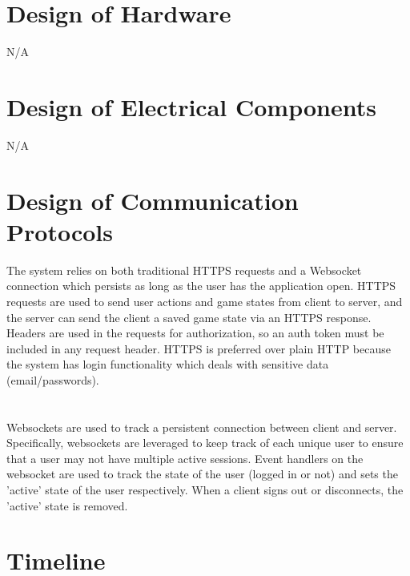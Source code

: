\documentclass[12pt, titlepage]{article}
\begin{document}
\section{Design of Hardware}
N/A

\section{Design of Electrical Components}
N/A

\section{Design of Communication Protocols}
The system relies on both traditional HTTPS requests and a Websocket connection which persists as long as the user has the application open. HTTPS requests are used to send user actions and game states from client to server, and the server can send the client a saved game state via an HTTPS response. Headers are used in the requests for authorization, so an auth token must be included in any request header. HTTPS is preferred over plain HTTP because the system has login functionality which deals with sensitive data (email/passwords).\\
\\
\\ Websockets are used to track a persistent connection between client and server. Specifically, websockets are leveraged to keep track of each unique user to ensure that a user may not have multiple active sessions. Event handlers on the websocket are used to track the state of the user (logged in or not) and sets the 'active' state of the user respectively. When a client signs out or disconnects, the 'active' state is removed. 

\section{Timeline}
\end{document}
